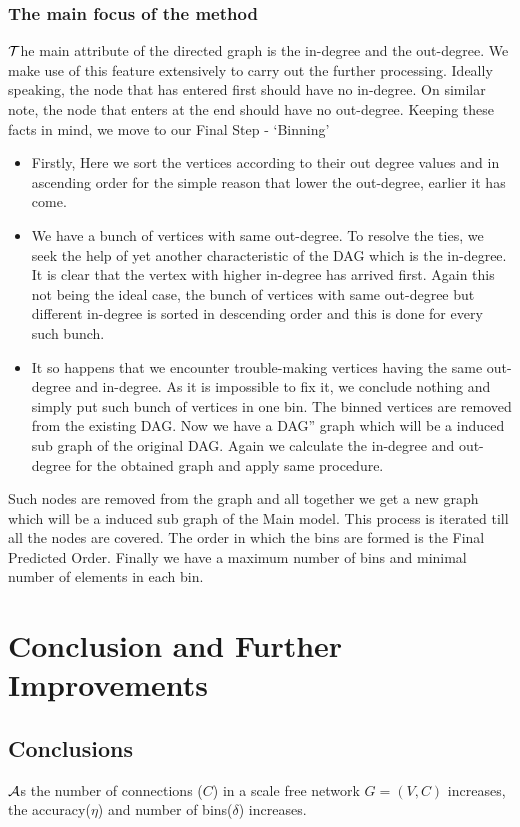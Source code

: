 \documentclass{article}
\begin{document}
\subsubsection{The main focus of the method}
\hspace{.17in}$\cal T$he main attribute of the directed graph is the in-degree and the out-degree. We make use of this feature extensively to carry out the further processing. Ideally speaking, the node that has entered first should have no in-degree. On similar note, the node that enters at the end should have no out-degree. Keeping these facts in mind, we move to our Final Step - ‘Binning’
\begin{itemize}
\item Firstly, Here we sort the vertices according to their out degree values and in ascending order for the simple reason that lower the out-degree, earlier it has come. 
\item We have a bunch of vertices with same out-degree. To resolve the ties, we seek the help of yet another characteristic of the DAG which is the in-degree. It is clear that the vertex with higher in-degree has arrived first. Again this not being the ideal case, the bunch of vertices with same out-degree but different in-degree is sorted in descending order and this is done for every such bunch.
\item It so happens that we encounter trouble-making vertices having the same out-degree and in-degree. As it is impossible to fix it, we conclude nothing and simply put such bunch of vertices in one bin. The binned vertices are removed from the existing DAG. Now we have a DAG” graph which will be a induced sub graph of the original DAG. Again we calculate the in-degree and out-degree for the obtained graph and apply same procedure.
\end{itemize} 
Such nodes are removed from the graph and all together we get a new graph which will be a induced sub graph of the Main model. This process is iterated till all the nodes are covered. The order in which the bins are formed is the Final Predicted Order. Finally we have a maximum number of bins and minimal number of elements in each bin.

\section{Conclusion and Further Improvements}
\subsection{Conclusions}
\hspace{.18in} $\cal A$s the number of connections ($C$) in a scale free network
$G=(V,C)$ increases, the accuracy($\eta$) and number of bins($\delta$) increases.   
\end{document}
